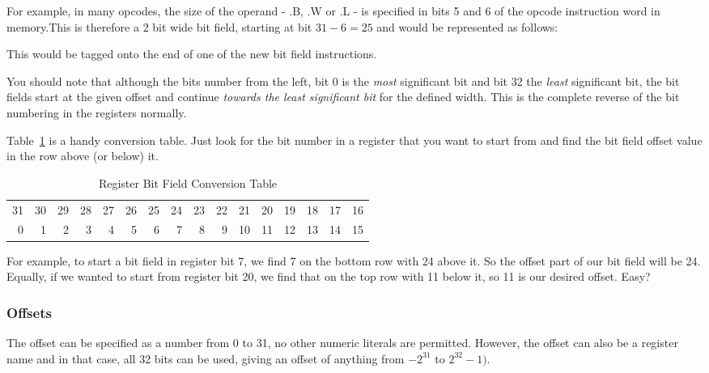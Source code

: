 
For example, in many opcodes, the size of the operand - .B, .W or .L - is specified in bits 5 and 6 of the opcode instruction word in memory.This is therefore a 2 bit wide bit field, starting at bit $31-6=25$ and would be represented as follows:


This would be tagged onto the end of one of the new bit field instructions. 

You should note that although the bits number from the left, bit 0 is the \emph{most} significant bit and bit 32 the \emph{least} significant bit, the bit fields start at the given offset and continue \emph{towards the least significant bit} for the defined width. This is the complete reverse of the bit numbering in the registers normally.

Table~\ref{tab-RBFCT} is a handy conversion table. Just look for the bit number in a register that you want to start from and find the bit field offset value in the row above (or below) it.

\begin{table}[h]
   \centering
   \begin{tabular}{r|r|r|r|r|r|r|r|r|r|r|r|r|r|r|r}
   31 & 30 & 29 & 28 & 27 & 26 & 25 & 24 & 23 & 22 & 21 & 20 & 19 & 18 & 17 & 16 \\
    0 &  1 &  2 &  3 &  4 &  5 &  6 &  7 &  8 &  9 & 10 & 11 & 12 & 13 & 14 & 15 \\
	\end{tabular}
   \caption{Register Bit Field Conversion Table}
   \label{tab-RBFCT}
\end{table}

For example, to start a bit field in register bit 7, we find 7 on the bottom row with 24 above it. So the offset part of our bit field will be 24. Equally, if we wanted to start from register bit 20, we find that on the top row with 11 below it, so 11 is our desired offset. Easy?

\subsubsection{Offsets}

The offset can be specified as a number from 0 to 31, no other numeric literals are permitted. However, the offset can also be a register name and in that case, all 32 bits can be used, giving an offset of anything from $-2^{31}$ to $2^{32}-1)$. 

